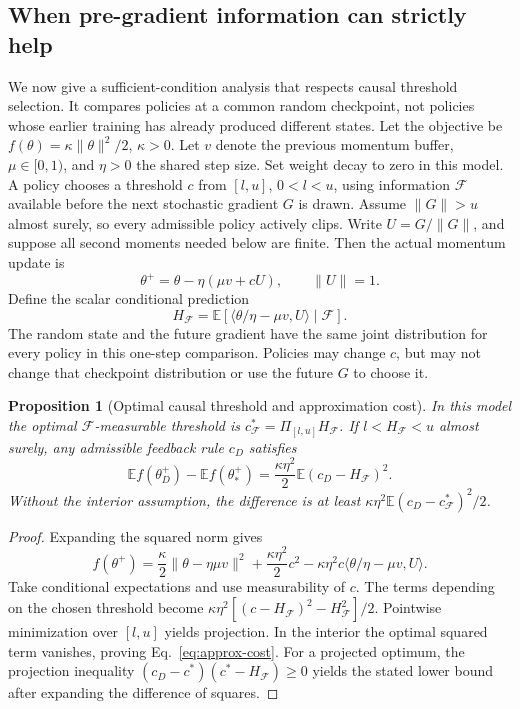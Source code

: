 \documentclass{article}
\newtheorem{proposition}{Proposition}
\begin{document}
\subsection{When pre-gradient information can strictly help}
We now give a sufficient-condition analysis that respects causal threshold
selection. It compares policies at a common random checkpoint, not policies
whose earlier training has already produced different states.
Let the objective be $f(\theta)=\kappa\|\theta\|^2/2$, $\kappa>0$.
Let $v$ denote the previous momentum buffer, $\mu\in[0,1)$, and
$\eta>0$ the shared step size. Set weight decay to zero in this model.
A policy chooses a threshold $c$ from $[l,u]$, $0<l<u$, using information
$\mathcal F$ available before the next stochastic gradient $G$ is drawn.
Assume $\|G\|>u$ almost surely, so every admissible policy actively clips.
Write $U=G/\|G\|$, and suppose all second moments needed below are finite.
Then the actual momentum update is
\begin{equation}
 \theta^+=\theta-\eta(\mu v+cU),\qquad \|U\|=1.
\end{equation}
Define the scalar conditional prediction
\begin{equation}
 H_{\mathcal F}=
 \mathbb E[\langle\theta/\eta-\mu v,U\rangle\mid\mathcal F].
 \label{eq:conditional-H}
\end{equation}
The random state and the future gradient have the same joint distribution
for every policy in this one-step comparison. Policies may change $c$, but
may not change that checkpoint distribution or use the future $G$ to choose it.

\begin{proposition}[Optimal causal threshold and approximation cost]
In this model the optimal $\mathcal F$-measurable threshold is
$c^*_{\mathcal F}=\Pi_{[l,u]}H_{\mathcal F}$. If
$l<H_{\mathcal F}<u$ almost surely, any admissible feedback rule $c_D$ satisfies
\begin{equation}
 \mathbb E f(\theta_D^+)-\mathbb E f(\theta_*^+)
 =\frac{\kappa\eta^2}{2}
   \mathbb E(c_D-H_{\mathcal F})^2.
 \label{eq:approx-cost}
\end{equation}
Without the interior assumption, the difference is at least
$\kappa\eta^2\mathbb E(c_D-c^*_{\mathcal F})^2/2$.
\end{proposition}
\begin{proof}
Expanding the squared norm gives
\begin{equation}
 f(\theta^+)=\frac{\kappa}{2}\|\theta-\eta\mu v\|^2
 +\frac{\kappa\eta^2}{2}c^2
 -\kappa\eta^2c\langle\theta/\eta-\mu v,U\rangle.
\end{equation}
Take conditional expectations and use measurability of $c$. The terms
depending on the chosen threshold become
$\kappa\eta^2[(c-H_{\mathcal F})^2-H_{\mathcal F}^2]/2$.
Pointwise minimization over $[l,u]$ yields projection. In the interior the
optimal squared term vanishes, proving Eq.~\eqref{eq:approx-cost}. For a
projected optimum, the projection inequality
$(c_D-c^*)(c^*-H_{\mathcal F})\geq0$ yields the stated lower bound after
expanding the difference of squares.
\end{proof}
\end{document}
